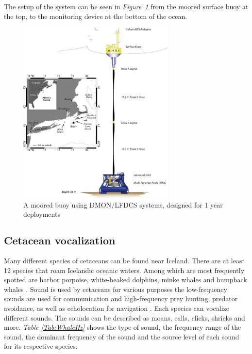 The setup of the system can be seen in \textit{Figure~\ref{fig:DMON/LFDCS}} from the moored surface buoy at the top, to the monitoring device at the bottom of the ocean.

\begin{figure}[h]
    \centering
    \includegraphics[width=0.70\textwidth]{graphics/DMONbuoy.jpg}
    \caption{A moored buoy using DMON/LFDCS systems, designed for 1 year deployments\cite{baumgartner_persistent_2019}}
    \label{fig:DMON/LFDCS}
\end{figure}

\clearpage


\subsection{Cetacean vocalization}

Many different species of cetaceans can be found near Iceland.
There are at least 12 species that roam Icelandic oceanic waters.
Among which are most frequently spotted are harbor porpoise, white-beaked dolphins, minke whales and humpback whales \cite{user_whales_nodate}.
Sound is used by cetaceans for various purposes the low-frequency sounds are used for communication and high-frequency prey hunting, predator avoidance, as well as echolocation for navigation \cite{nowacek_studying_2016}.
Each species can vocalize different sounds.
The sounds can be described as moans, calls, clicks, shrieks and more\cite{greenhow_hearing_nodate}.
\textit{Table \ref{Tab:WhaleHz}} shows the type of sound, the frequency range of the sound, the dominant frequency of the sound and the source level of each sound for its respective species.

